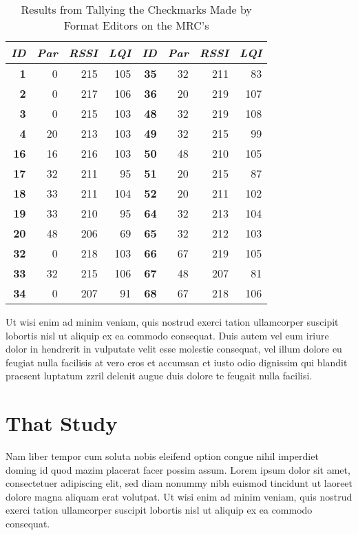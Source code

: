\begin{table}
\begin{center}
\begin{tabular}{|r|r|r|r||r|r|r|r|}
\hline \textbf{\textit{ID}} & \textbf{\textit{Par}} & \textbf{\textit{RSSI}} &
\textbf{\textit{LQI}} &
\textbf{\textit{ID}} & \textbf{\textit{Par}} & \textbf{\textit{RSSI}} & \textbf{\textit{LQI}} \\
\hline \hline
\textbf{1}  &  0 & 215 & 105 & \textbf{35} & 32 & 211 &  83 \\
\textbf{2}  &  0 & 217 & 106 & \textbf{36} & 20 & 219 & 107 \\
\textbf{3}  &  0 & 215 & 103 & \textbf{48} & 32 & 219 & 108 \\
\textbf{4}  & 20 & 213 & 103 & \textbf{49} & 32 & 215 &  99 \\
\textbf{16} & 16 & 216 & 103 & \textbf{50} & 48 & 210 & 105 \\
\textbf{17} & 32 & 211 &  95 & \textbf{51} & 20 & 215 &  87 \\
\textbf{18} & 33 & 211 & 104 & \textbf{52} & 20 & 211 & 102 \\
\textbf{19} & 33 & 210 &  95 & \textbf{64} & 32 & 213 & 104 \\
\textbf{20} & 48 & 206 &  69 & \textbf{65} & 32 & 212 & 103 \\
\textbf{32} &  0 & 218 & 103 & \textbf{66} & 67 & 219 & 105 \\
\textbf{33} & 32 & 215 & 106 & \textbf{67} & 48 & 207 &  81 \\
\textbf{34} &  0 & 207 &  91 & \textbf{68} & 67 & 218 & 106 \\
\hline
\end{tabular}
\caption{Results from Tallying the Checkmarks Made by Format Editors on the MRC's}
\end{center}
\end{table}

Ut wisi enim ad minim veniam, quis nostrud exerci tation ullamcorper suscipit
lobortis nisl ut aliquip ex ea commodo consequat. Duis autem vel eum iriure
dolor in hendrerit in vulputate velit esse molestie consequat, vel illum dolore
eu feugiat nulla facilisis at vero eros et accumsan et iusto odio dignissim qui
blandit praesent luptatum zzril delenit augue duis dolore te feugait nulla
facilisi.

\section{That Study}
Nam liber tempor cum soluta nobis eleifend option congue nihil imperdiet doming
id quod mazim placerat facer possim assum. Lorem ipsum dolor sit amet,
consectetuer adipiscing elit, sed diam nonummy nibh euismod tincidunt ut laoreet
dolore magna aliquam erat volutpat. Ut wisi enim ad minim veniam, quis nostrud
exerci tation ullamcorper suscipit lobortis nisl ut aliquip ex ea commodo
consequat.

